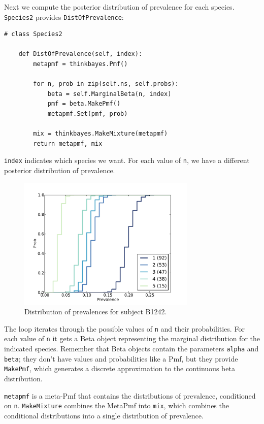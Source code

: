 \documentclass[12pt]{book}
\begin{document}
Next we compute the posterior distribution of prevalence for
each species.  {\tt Species2} provides {\tt DistOfPrevalence}:

\begin{verbatim}
# class Species2

    def DistOfPrevalence(self, index):
        metapmf = thinkbayes.Pmf()

        for n, prob in zip(self.ns, self.probs):
            beta = self.MarginalBeta(n, index)
            pmf = beta.MakePmf()
            metapmf.Set(pmf, prob)

        mix = thinkbayes.MakeMixture(metapmf)
        return metapmf, mix
\end{verbatim}

{\tt index} indicates which species we want.  For each
value of {\tt n}, we have a different posterior distribution
of prevalence.

\begin{figure}
\centerline{\includegraphics[height=2.5in]{figs/species-prev-B1242.pdf}}
\caption{Distribution of prevalences for subject B1242.}
\label{species-prev}
\end{figure}

The loop iterates through the possible values of {\tt n}
and their probabilities.  For each value of {\tt n} it gets
a Beta object representing the marginal distribution for the
indicated species.  Remember that Beta objects contain the
parameters {\tt alpha} and {\tt beta}; they don't have
values and probabilities like a Pmf, but they provide {\tt MakePmf},
which generates a discrete approximation to the continuous
beta distribution.

{\tt metapmf} is a meta-Pmf that contains the distributions
of prevalence, conditioned on {\tt n}.  {\tt MakeMixture}
combines the MetaPmf into {\tt mix}, which combines the
conditional distributions into a single distribution
of prevalence.
\end{document}
